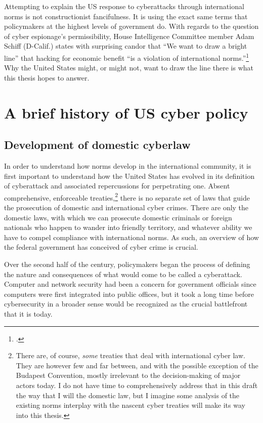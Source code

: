 \documentclass{report}
\begin{document}
\begin{refsegment}
Attempting to explain the US response to cyberattacks through international norms is not constructionist fancifulness. It is using the exact same terms that policymakers at the highest levels of government do. With regards to the question of cyber espionage's permissibility, House Intelligence Committee member Adam Schiff (D-Calif.) states with surprising candor that ``We want to draw a bright line” that hacking for economic benefit “is a violation of international norms.''\footcite{nakashima_hacks_2015} Why the United States might, or might not, want to draw the line there is what this thesis hopes to answer.






\section{A brief history of US cyber policy}
\subsection{Development of domestic cyberlaw}
In order to understand how norms develop in the international community, it is first important to understand how the United States has evolved in its definition of cyberattack and associated repercussions for perpetrating one. Absent comprehensive, enforceable treaties,\footnote{There are, of course, \emph{some} treaties that deal with international cyber law. They are however few and far between, and with the possible exception of the Budapest Convention, mostly irrelevant to the decision-making of major actors today. I do not have time to comprehensively address that in this draft the way that I will the domestic law, but I imagine some analysis of the existing norms interplay with the nascent cyber treaties will make its way into this thesis.} there is no separate set of laws that guide the prosecution of domestic and international cyber crimes. There are only the domestic laws, with which we can prosecute domestic criminals or foreign nationals who happen to wander into friendly territory, and whatever ability we have to compel compliance with international norms. As such, an overview of how the federal government has conceived of cyber crime is crucial.

Over the second half of the  century, policymakers began the process of defining the nature and consequences of what would come to be called a cyberattack. Computer and network security had been a concern for government officials since computers were first integrated into public offices, but it took a long time before cybersecurity in a broader sense would be recognized as the crucial battlefront that it is today.


\end{refsegment}
\end{document}
